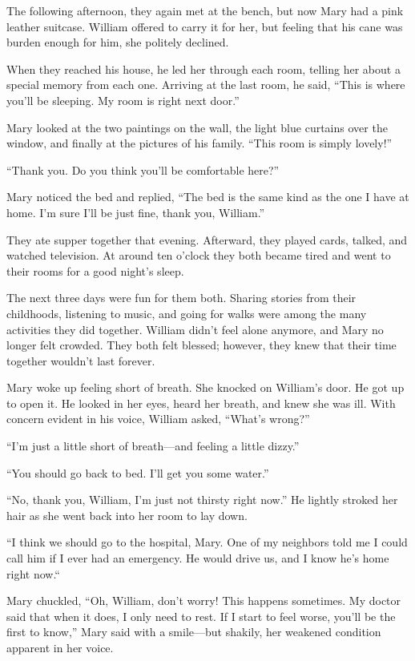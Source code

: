 The following afternoon, they again met at the bench, but now Mary had a pink leather suitcase. William offered to carry it for her, but feeling that his cane was burden enough for him, she politely declined.

When they reached his house, he led her through each room, telling her about a special memory from each one. Arriving at the last room, he said, “This is where you'll be sleeping. My room is right next door.”

Mary looked at the two paintings on the wall, the light blue curtains over the window, and finally at the pictures of his family. “This room is simply lovely!”

“Thank you. Do you think you'll be comfortable here?”

Mary noticed the bed and replied, “The bed is the same kind as the one I have at home. I'm sure I'll be just fine, thank you, William.”

They ate supper together that evening. Afterward, they played cards, talked, and watched television. At around ten o'clock they both became tired and went to their rooms for a good night's sleep.

The next three days were fun for them both. Sharing stories from their childhoods, listening to music, and going for walks were among the many activities they did together. William didn't feel alone anymore, and Mary no longer felt crowded. They both felt blessed; however, they knew that their time together wouldn't last forever.

\timesep

Mary woke up feeling short of breath. She knocked on William's door. He got up to open it. He looked in her eyes, heard her breath, and knew she was ill. With concern evident in his voice, William asked, “What's wrong?”

“I'm just a little short of breath—and feeling a little dizzy.”

“You should go back to bed. I'll get you some water.”

“No, thank you, William, I'm just not thirsty right now.” He lightly stroked her hair as she went back into her room to lay down.

“I think we should go to the hospital, Mary. One of my neighbors told me I could call him if I ever had an emergency. He would drive us, and I know he's home right now.“

Mary chuckled, “Oh, William, don't worry! This happens sometimes. My doctor said that when it does, I only need to rest. If I start to feel worse, you'll be the first to know,” Mary said with a smile—but shakily, her weakened condition apparent in her voice.

